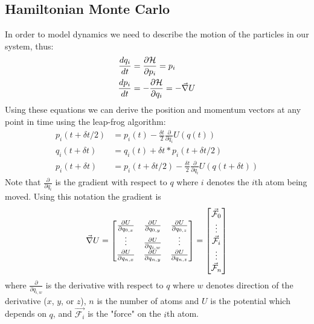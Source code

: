 \subsection{Hamiltonian Monte Carlo}

In order to model dynamics we need to describe the motion of the particles in our system, thus:
\begin{align}
  \frac{d q_{i}}{d t} &= \frac{\partial \mathcal{H}}{\partial p_{i}} = p_{i}\\
  \frac{d p_{i}}{d t} &= -\frac{\partial \mathcal{H}}{\partial q_{i}} = -\vec{\nabla} U  
\end{align}
Using these equations we can derive the position and momentum vectors at any point in time using the leap-frog algorithm:
\begin{align}
  p_{i}(t + \delta t/2) &= p_{i}(t) - \frac{\delta t}{2} \frac{\partial }{\partial q_{i}}U(q(t))\\
  q_{i}(t+\delta t)  &= q_{i}(t) + \delta t * p_{i}(t+\delta t/2)\\
  p_{i}(t+\delta t) &=   p_{i}(t + \delta t/2)- \frac{\delta t}{2} \frac{\partial }{\partial q_{i}}U(q(t+\delta t))
\end{align}
Note that $\frac{\partial}{\partial q_{i}}$ is the gradient with respect to $q$ where $i$ denotes the $i$th atom being moved.
Using this notation the gradient is
\begin{equation} \label{grad}
  \vec{\nabla} U = \begin{bmatrix}
    \frac{\partial U}{\partial q_{0, x}} & \frac{\partial U}{\partial q_{0, y}} & \frac{\partial U}{\partial q_{0, z}} \\
    \vdots & \frac{\partial U}{\partial q_{i, w}} & \vdots \\
    \frac{\partial U}{\partial q_{n, x}} & \frac{\partial U}{\partial q_{n, y}} & \frac{\partial U}{\partial q_{n, z}} \\
  \end{bmatrix} = 
  \begin{bmatrix}
    \vec{\mathcal{F}}_{0} \\
    \vdots \\
    \vec{\mathcal{F}}_{i} \\
    \vdots \\
    \vec{\mathcal{F}}_{n}\\
  \end{bmatrix}
\end{equation}
where $\frac{\partial}{\partial q_{i, w}}$ is the derivative with respect to $q$ where $w$ denotes direction of the derivative ($x$, $y$, or $z$),  $n$ is the number of atoms and $U$ is the potential which depends on $q$, and $\vec{\mathcal{F}_{i}}$ is the "force" on the $i$th atom.
